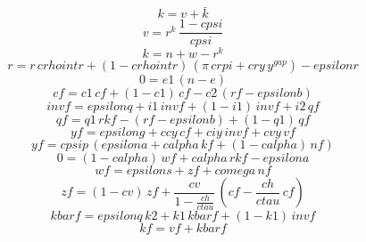 \begin{dmath}
{{k}}={{v}}+{{\bar{k}}}
\end{dmath}
\begin{dmath}
{{v}}={{r^{k}}}\, \frac{1-{cpsi}}{{cpsi}}
\end{dmath}
\begin{dmath}
{{k}}={{n}}+{{w}}-{{r^{k}}}
\end{dmath}
\begin{dmath}
{{r}}={{r}}\, {crhointr}+\left(1-{crhointr}\right)\, \left({{\pi}}\, {crpi}+{cry}\, {{y^{gap}}}\right)-{epsilonr}
\end{dmath}
\begin{dmath}
0={e1}\, \left({{n}}-{{e}}\right)
\end{dmath}
\begin{dmath}
{cf}={c1}\, {cf}+\left(1-{c1}\right)\, {cf}-{c2}\, \left({rf}-{epsilonb}\right)
\end{dmath}
\begin{dmath}
{invf}={epsilonq}+{i1}\, {invf}+\left(1-{i1}\right)\, {invf}+{i2}\, {qf}
\end{dmath}
\begin{dmath}
{qf}={q1}\, {rkf}-\left({rf}-{epsilonb}\right)+\left(1-{q1}\right)\, {qf}
\end{dmath}
\begin{dmath}
{yf}={epsilong}+{ccy}\, {cf}+{ciy}\, {invf}+{cvy}\, {vf}
\end{dmath}
\begin{dmath}
{yf}={cpsip}\, \left({epsilona}+{calpha}\, {kf}+\left(1-{calpha}\right)\, {nf}\right)
\end{dmath}
\begin{dmath}
0=\left(1-{calpha}\right)\, {wf}+{calpha}\, {rkf}-{epsilona}
\end{dmath}
\begin{dmath}
{wf}={epsilons}+{zf}+{comega}\, {nf}
\end{dmath}
\begin{dmath}
{zf}=\left(1-{cv}\right)\, {zf}+\frac{{cv}}{1-\frac{{ch}}{{ctau}}}\, \left({cf}-\frac{{ch}}{{ctau}}\, {cf}\right)
\end{dmath}
\begin{dmath}
{kbarf}={epsilonq}\, {k2}+{k1}\, {kbarf}+\left(1-{k1}\right)\, {invf}
\end{dmath}
\begin{dmath}
{kf}={vf}+{kbarf}
\end{dmath}
